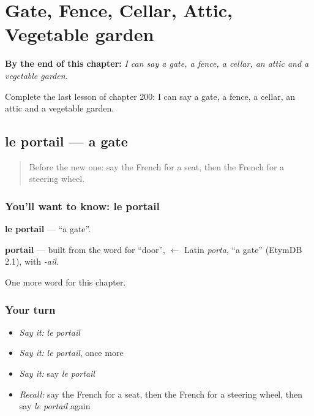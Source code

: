 
\chapter{Gate, Fence, Cellar, Attic, Vegetable garden}
\label{ch:fr-gate-fence-cellar-attic-vegetable-garden}

\begin{chapteropening}
\textbf{By the end of this chapter:} \emph{I can say a gate, a fence, a cellar, an attic and a vegetable garden.}

Complete the last lesson of chapter 200: I can say a gate, a fence, a cellar, an attic and a vegetable garden.
\end{chapteropening}

\section[le portail]{le portail — a gate}

\label{lesson:FR-C200-portail}



\begin{quote}
Before the new one: say the French for a seat, then the French for a steering wheel.
\end{quote}

\subsection*{You'll want to know: le portail}
\textbf{le portail} — \textquotedblleft{}a gate\textquotedblright{}.

\begin{cousinweb}
\textbf{portail} — built from the word for \textquotedblleft{}door\textquotedblright{}, $\leftarrow$ Latin \emph{porta}, \textquotedblleft{}a gate\textquotedblright{} (EtymDB 2.1), with \emph{-ail}.
\end{cousinweb}

\begin{grammarlens}[title={What you've built}]
One more word for this chapter.
\end{grammarlens}

\subsection*{Your turn}
\begin{itemize}
\raggedright
  \item \emph{Say it:} \emph{le portail}
  \item \emph{Say it:} \emph{le portail}, once more
  \item \emph{Say it:} say \emph{le portail}
  \item \emph{Recall:} say the French for a seat, then the French for a steering wheel, then say \emph{le portail} again
\end{itemize}

